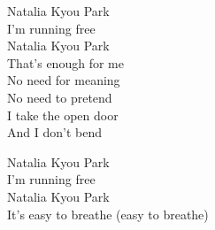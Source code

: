 \begin{lyrics}
Natalia Kyou Park\\
I’m running free\\
Natalia Kyou Park\\
That’s enough for me\\
No need for meaning\\
No need to pretend\\
I take the open door\\
And I don’t bend

Natalia Kyou Park\\
I’m running free\\
Natalia Kyou Park\\
It’s easy to breathe (easy to breathe)
\end{lyrics}

